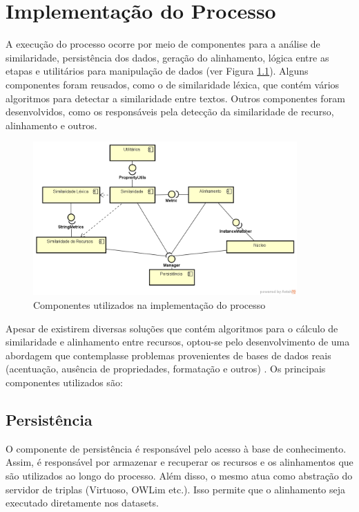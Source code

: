\chapter{Implementação do Processo}
\label{cap:componentes}
A execução do processo ocorre por meio de componentes para a análise de similaridade, persistência dos dados, geração do alinhamento, lógica entre as etapas e utilitários para manipulação de dados (ver Figura \ref{fig:componentes}). Alguns componentes foram reusados, como o de similaridade léxica, que contém vários algoritmos para detectar a similaridade entre textos. Outros componentes foram desenvolvidos, como os responsáveis pela detecção da similaridade de recurso, alinhamento e outros.

\begin{figure}[!ht]
	\centering
	\includegraphics[width=0.9\textwidth]{./imagens/componentes.png}
    \caption{Componentes utilizados na implementação do processo}
	\label{fig:componentes}
\end{figure}

Apesar de existirem diversas soluções que contém algoritmos para o cálculo de similaridade e alinhamento entre recursos, optou-se pelo desenvolvimento de uma abordagem que contemplasse problemas provenientes de bases de dados reais (acentuação, ausência de propriedades, formatação e outros) \cite{castano2011ontology,ferrara2008towards}.
Os principais componentes utilizados são:

\section{Persistência}
O componente de persistência é responsável pelo acesso à base de conhecimento. Assim, é responsável por armazenar e recuperar os recursos e os alinhamentos que são utilizados ao longo do processo. Além disso, o mesmo atua como abstração do servidor de triplas (Virtuoso, OWLim etc.). Isso permite que o alinhamento seja executado diretamente nos datasets.

